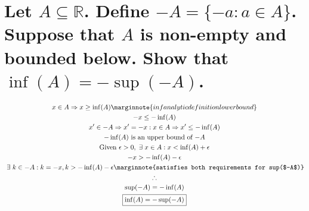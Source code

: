 \documentclass[letterpaper]{article}
\begin{document}
\section{Let $A \subseteq \mathbb{R}$. Define $-A=\{-a:a\in A\}$. Suppose that $A$ is non-empty and bounded below. Show that
$\inf(A)=-\sup(-A)$.}
\begin{gather*}
x \in A \Rightarrow x \geq \inf(A) \marginnote{inf analytic definition lower bound} \\
-x\leq-\inf(A) \\
x'\in -A \Rightarrow x'=-x: x\in A \Rightarrow x' \leq-\inf(A) \\
-\inf(A) \text{ is an upper bound of $-A$} \\ 
\text{Given } \epsilon>0,\hspace{3pt}\exists\hspace{3pt}x\in A:x<\inf(A)+\epsilon \\
-x > -\inf(A) - \epsilon \\
\hspace{3pt}\exists\hspace{3pt}k\in -A:k=-x,k>-\inf(A)-\epsilon \marginnote{satisfies both requirements for sup($-A$)} \\
\therefore \\
\sup(-A)=-\inf(A) \\
\boxed{\inf(A)=-\sup(-A)}
\end{gather*}
\end{document}
